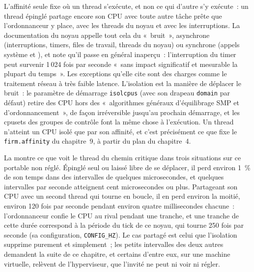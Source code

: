 L'affinité seule fixe où un thread s'exécute, et non ce qui d'autre s'y exécute~: un thread épinglé partage encore son CPU avec toute autre
tâche prête que l'ordonnanceur y place, avec les threads du noyau et avec les interruptions. La documentation du noyau appelle tout cela
du «~bruit~», asynchrone (interruptions, timers, files de travail, threads du noyau) ou synchrone (appels système et ), et note qu'il passe en général inaperçu~: l'interruption du timer peut survenir 1\,024 fois par seconde «~sans impact
significatif et mesurable la plupart du temps~». Les exceptions qu'elle cite sont des charges comme le traitement réseau à très faible latence.
L'isolation est la manière de déplacer le bruit~: le paramètre de démarrage \texttt{isolcpus} (avec son drapeau \texttt{domain} par défaut) retire des CPU
hors des «~algorithmes généraux d'équilibrage SMP et d'ordonnancement~», de façon irréversible jusqu'au prochain démarrage, et les cpusets des groupes de contrôle
font la même chose à l'exécution. Un thread n'atteint un CPU isolé que par son affinité, et c'est précisément ce que fixe le
\texttt{firm.affinity} du chapitre~9, à partir du plan du chapitre~4.

La  montre ce que voit le thread du chemin critique dans trois situations sur ce portable non réglé. Épinglé seul
ou laissé libre de se déplacer, il perd environ 1~\% de son temps dans des intervalles de quelques microsecondes, et quelques intervalles par seconde atteignent
cent microsecondes ou plus. Partageant son CPU avec un second thread qui tourne en boucle, il en perd environ la moitié, environ 120 fois par
seconde pendant environ quatre millisecondes chacune~: l'ordonnanceur confie le CPU au rival pendant une tranche, et une tranche de cette durée
correspond à la période du tick de ce noyau, qui tourne 250 fois par seconde (sa configuration, \texttt{CONFIG\_HZ}). Le cas partagé est celui que
l'isolation supprime purement et simplement~; les petits intervalles des deux autres demandent la suite de ce chapitre, et certains d'entre eux, sur une
machine virtuelle, relèvent de l'hyperviseur, que l'invité ne peut ni voir ni régler.

